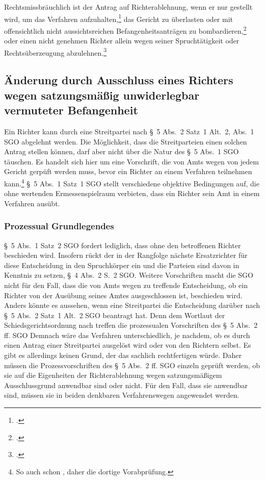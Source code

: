 Rechtsmissbräuchlich ist der Antrag auf Richterablehnung, wenn er nur gestellt wird, um das Verfahren aufzuhalten,\footnote{\cites[S.~8]{BSG2815HS}.} das Gericht zu überlasten oder mit offensichtlich nicht aussichtsreichen Befangenheitsanträgen zu bombardieren,\footnote{\cites[S.~4]{BSG201305062BefangenheitII}.} oder einen nicht genehmen Richter allein wegen seiner Spruchtätigkeit oder Rechtsüberzeugung abzulehnen.\footnote{\cites[S.~5]{BSG115HSBefangeheitIV}{OLGNaumburg3WF7609}.}

\subsection{Änderung durch Ausschluss eines Richters wegen satzungsmäßig unwiderlegbar vermuteter Befangenheit}
\label{Zusammensetzung:Spruchkoerper:Befangenheitsvermutung}
Ein Richter kann durch eine Streitpartei nach \S~5 Abs.~2 Satz~1 Alt.~2, Abs.~1 SGO abgelehnt werden.
Die Möglichkeit, dass die Streitparteien einen solchen Antrag stellen können, darf aber nicht über die Natur des \S~5 Abs.~1 SGO täuschen.
Es handelt sich hier um eine Vorschrift, die von Amts wegen von jedem Gericht gerpüft werden muss, bevor ein Richter an einem Verfahren teilnehmen kann.\footnote{So auch schon \cite{BSGPP100127862}, daher die dortige Vorabprüfung.} \S~5 Abs.~1 Satz~1 SGO stellt verschiedene objektive Bedingungen auf, die ohne wertenden Ermessenspielraum verbieten, dass ein Richter sein Amt in einem Verfahren ausübt.

\subsubsection{Prozessual Grundlegendes}
\label{Zusammensetzung:Spruchkoerper:Befangenheitsvermutung:Prozessuales}
\S~5 Abs.~1 Satz~2 SGO fordert lediglich, dass ohne den betroffenen Richter beschieden wird.
Insofern rückt der in der Rangfolge nächste Ersatzrichter für diese Entscheidung in den Spruchkörper ein und die Parteien sind davon in Kenntnis zu setzen, \S~4 Abs.~2 S.~2 SGO.
Weitere Vorschriften macht die SGO nicht für den Fall, dass die von Amts wegen zu treffende Entscheidung, ob ein Richter von der Ausübung seines Amtes ausgeschlossen ist, beschieden wird.
Anders könnte es aussehen, wenn eine Streitpartei die Entscheidung darüber nach \S~5 Abs.~2 Satz~1 Alt.~2 SGO beantragt hat.
Denn dem Wortlaut der Schiedsgerichtsordnung nach treffen die prozessualen Vorschriften des \S~5 Abs.~2 ff. SGO
Demnach wäre das Verfahren unterschiedlich, je nachdem, ob es durch einen Antrag einer Streitpartei ausgelöst wird oder von den Richtern selbst.
Es gibt es allerdings keinen Grund, der das sachlich rechtfertigen würde.
Daher müssen die Prozessvorschriften des \S~5 Abs.~2 ff. SGO einzeln geprüft werden, ob sie auf die Eigenheiten der Richterablehnung wegen satzungsmäßigem Ausschlussgrund anwendbar sind oder nicht.
Für den Fall, dass sie anwendbar sind, müssen sie in beiden denkbaren Verfahrenswegen angewendet werden.

